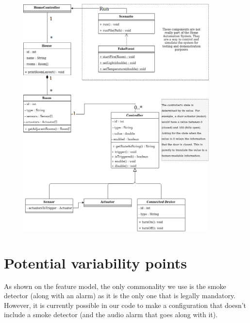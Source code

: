 		\begin{figure}[H]
            \includegraphics[width=0.9\textwidth]{class_diagram.png}
        \end{figure}

	\section{Potential variability points}
		As shown on the feature model, the only commonality we use is the smoke detector (along with an alarm) as it is the only one that is legally mandatory. However, it is currently possible in our code to make a configuration that doesn't include a smoke detector (and the audio alarm that goes along with it).

